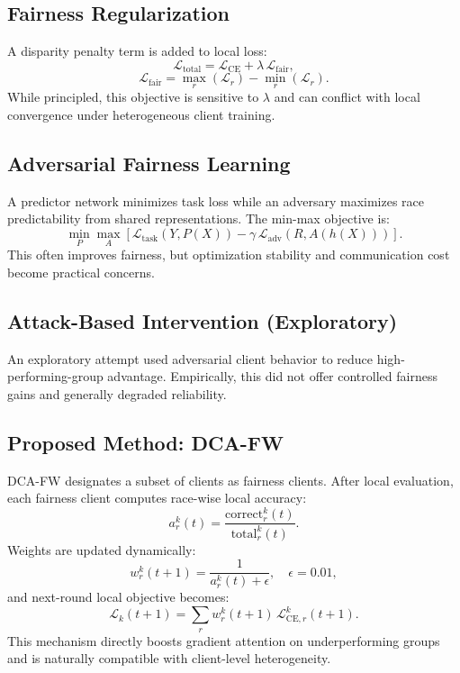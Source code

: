\documentclass[11pt,a4paper]{article}
\begin{document}
\subsection{Fairness Regularization}
A disparity penalty term is added to local loss:
\begin{equation}
\mathcal{L}_{\mathrm{total}} = \mathcal{L}_{\mathrm{CE}} + \lambda\,\mathcal{L}_{\mathrm{fair}},
\end{equation}
\begin{equation}
\mathcal{L}_{\mathrm{fair}} = \max_r(\mathcal{L}_r) - \min_r(\mathcal{L}_r).
\end{equation}
While principled, this objective is sensitive to $\lambda$ and can conflict with local convergence under heterogeneous client training.

\subsection{Adversarial Fairness Learning}
A predictor network minimizes task loss while an adversary maximizes race predictability from shared representations. The min-max objective is:
\begin{equation}
\min_{P}\max_{A} \left[\mathcal{L}_{\mathrm{task}}(Y,P(X)) - \gamma\,\mathcal{L}_{\mathrm{adv}}(R,A(h(X)))\right].
\end{equation}
This often improves fairness, but optimization stability and communication cost become practical concerns.

\subsection{Attack-Based Intervention (Exploratory)}
An exploratory attempt used adversarial client behavior to reduce high-performing-group advantage. Empirically, this did not offer controlled fairness gains and generally degraded reliability.

\subsection{Proposed Method: DCA-FW}
DCA-FW designates a subset of clients as fairness clients. After local evaluation, each fairness client computes race-wise local accuracy:
\begin{equation}
a_r^k(t)=\frac{\mathrm{correct}_r^k(t)}{\mathrm{total}_r^k(t)}.
\end{equation}
Weights are updated dynamically:
\begin{equation}
w_r^k(t+1)=\frac{1}{a_r^k(t)+\epsilon},\quad \epsilon=0.01,
\end{equation}
and next-round local objective becomes:
\begin{equation}
\mathcal{L}_k(t+1)=\sum_r w_r^k(t+1)\,\mathcal{L}_{\mathrm{CE},r}^k(t+1).
\end{equation}
This mechanism directly boosts gradient attention on underperforming groups and is naturally compatible with client-level heterogeneity.
\end{document}
